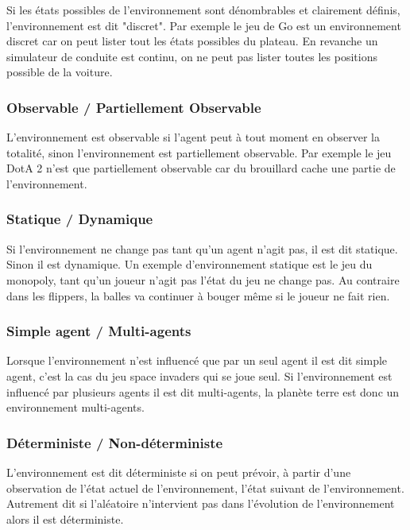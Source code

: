\documentclass{article}
\begin{document}
Si les états possibles de l'environnement sont dénombrables et clairement définis, l'environnement est dit "discret". Par exemple le jeu de Go est un environnement discret car on peut lister tout les états possibles du plateau. En revanche un simulateur de conduite est continu, on ne peut pas lister toutes les positions possible de la voiture.\cite{tutoptai}

\subsubsection{Observable / Partiellement Observable}

L'environnement est observable si l'agent peut à tout moment en observer la totalité, sinon l'environnement est partiellement observable. Par exemple le jeu DotA 2 n'est que partiellement observable car du brouillard cache une partie de l'environnement.\cite{tutoptai}

\subsubsection{Statique / Dynamique}

Si l'environnement ne change pas tant qu'un agent n'agit pas, il est dit statique. Sinon il est dynamique. Un exemple d'environnement statique est le jeu du monopoly, tant qu'un joueur n'agit pas l'état du jeu ne change pas. Au contraire dans les flippers, la balles va continuer à bouger même si le joueur ne fait rien.\cite{tutoptai}

\subsubsection{Simple agent / Multi-agents}

Lorsque l'environnement n'est influencé que par un seul agent il est dit simple agent, c'est la cas du jeu space invaders qui se joue seul. Si l'environnement est influencé par plusieurs agents il est dit multi-agents, la planète terre est donc un environnement multi-agents.\cite{tutoptai}

\subsubsection{Déterministe / Non-déterministe}

L'environnement est dit déterministe si on peut prévoir, à partir d'une observation de l'état actuel de l'environnement, l'état suivant de l'environnement. Autrement dit si l'aléatoire n'intervient pas dans l'évolution de l'environnement alors il est déterministe.\cite{tutoptai}
\end{document}
